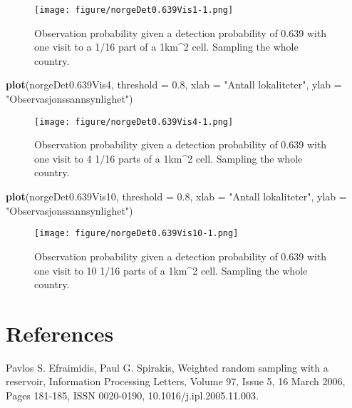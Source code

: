 \documentclass[]{article}
\newenvironment{Shaded}{\begin{snugshade}}{\end{snugshade}}
\newcommand{\KeywordTok}[1]{\textcolor[rgb]{0.13,0.29,0.53}{\textbf{#1}}}
\newcommand{\DataTypeTok}[1]{\textcolor[rgb]{0.13,0.29,0.53}{#1}}
\newcommand{\FloatTok}[1]{\textcolor[rgb]{0.00,0.00,0.81}{#1}}
\newcommand{\StringTok}[1]{\textcolor[rgb]{0.31,0.60,0.02}{#1}}
\newcommand{\NormalTok}[1]{#1}
\begin{document}
\begin{figure}
\centering
\texttt{[image: figure/norgeDet0.639Vis1-1.png]}
\caption{Observation probability given a detection probability of 0.639
with one visit to a 1/16 part of a 1km\^{}2 cell. Sampling the whole
country.}
\end{figure}

\begin{Shaded}
\begin{Highlighting}[]
\KeywordTok{plot}\NormalTok{(norgeDet0.639Vis4, }\DataTypeTok{threshold =} \FloatTok{0.8}\NormalTok{, }\DataTypeTok{xlab =} \StringTok{"Antall lokaliteter"}\NormalTok{, }\DataTypeTok{ylab =} \StringTok{"Observasjonssannsynlighet"}\NormalTok{)}
\end{Highlighting}
\end{Shaded}

\begin{figure}
\centering
\texttt{[image: figure/norgeDet0.639Vis4-1.png]}
\caption{Observation probability given a detection probability of 0.639
with one visit to 4 1/16 parts of a 1km\^{}2 cell. Sampling the whole
country.}
\end{figure}

\begin{Shaded}
\begin{Highlighting}[]
\KeywordTok{plot}\NormalTok{(norgeDet0.639Vis10, }\DataTypeTok{threshold =} \FloatTok{0.8}\NormalTok{, }\DataTypeTok{xlab =} \StringTok{"Antall lokaliteter"}\NormalTok{, }\DataTypeTok{ylab =} \StringTok{"Observasjonssannsynlighet"}\NormalTok{)}
\end{Highlighting}
\end{Shaded}

\begin{figure}
\centering
\texttt{[image: figure/norgeDet0.639Vis10-1.png]}
\caption{Observation probability given a detection probability of 0.639
with one visit to 10 1/16 parts of a 1km\^{}2 cell. Sampling the whole
country.}
\end{figure}

\section{References}\label{references}

Pavlos S. Efraimidis, Paul G. Spirakis, Weighted random sampling with a
reservoir, Information Processing Letters, Volume 97, Issue 5, 16 March
2006, Pages 181-185, ISSN 0020-0190, 10.1016/j.ipl.2005.11.003.
\end{document}
